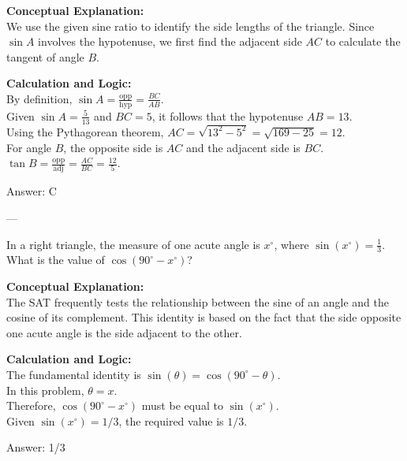 \documentclass[11pt,paper=a4,answers]{exam}
\begin{document}
\begin{questions}
\begin{solution}
\textbf{Conceptual Explanation:} \\
We use the given sine ratio to identify the side lengths of the triangle. Since $\sin A$ involves the hypotenuse, we first find the adjacent side $AC$ to calculate the tangent of angle $B$.

\vspace{10pt}
\textbf{Calculation and Logic:} \\
By definition, $\sin A = \frac{\text{opp}}{\text{hyp}} = \frac{BC}{AB}$. \\
Given $\sin A = \frac{5}{13}$ and $BC = 5$, it follows that the hypotenuse $AB = 13$. \\
Using the Pythagorean theorem, $AC = \sqrt{13^2 - 5^2} = \sqrt{169 - 25} = 12$. \\
For angle $B$, the opposite side is $AC$ and the adjacent side is $BC$. \\
$\tan B = \frac{\text{opp}}{\text{adj}} = \frac{AC}{BC} = \frac{12}{5}$.

\vspace{15pt}
Answer: \colorbox{yellow!100}{C}
\end{solution}

---

\question
In a right triangle, the measure of one acute angle is $x^\circ$, where $\sin(x^\circ) = \frac{1}{3}$. What is the value of $\cos(90^\circ - x^\circ)$?

\begin{solution}
\textbf{Conceptual Explanation:} \\
The SAT frequently tests the relationship between the sine of an angle and the cosine of its complement. This identity is based on the fact that the side opposite one acute angle is the side adjacent to the other.

\vspace{10pt}
\textbf{Calculation and Logic:} \\
The fundamental identity is $\sin(\theta) = \cos(90^\circ - \theta)$. \\
In this problem, $\theta = x$. \\
Therefore, $\cos(90^\circ - x^\circ)$ must be equal to $\sin(x^\circ)$. \\
Given $\sin(x^\circ) = 1/3$, the required value is $1/3$.

\vspace{15pt}
Answer: \colorbox{yellow!100}{1/3}
\end{solution}


\end{questions}
\end{document}
